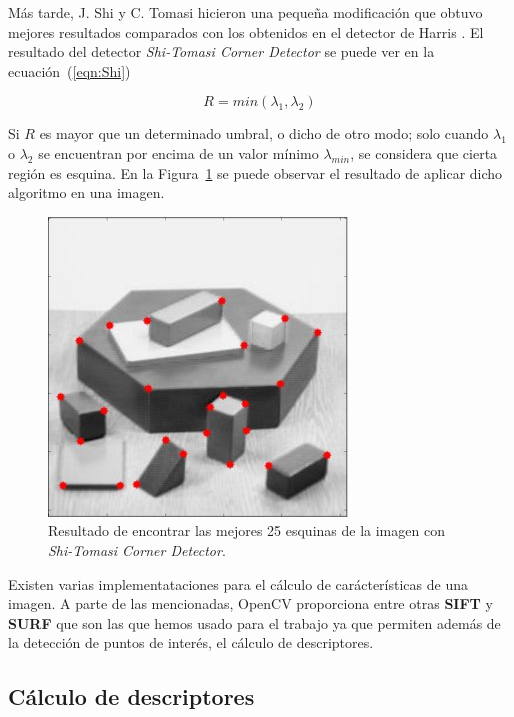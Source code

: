 Más tarde, J. Shi y C. Tomasi hicieron una pequeña modificación que obtuvo mejores resultados comparados con los obtenidos en el detector de Harris \parencite{Reference9}. El resultado del detector \textit{Shi-Tomasi Corner Detector} se puede ver en la ecuación~(\ref{eqn:Shi})

\begin{equation}
R=min(\lambda_{1},\lambda_{2})
\label{eqn:Shi}
\end{equation}

Si $R$ es mayor que un determinado umbral, o dicho de otro modo; solo cuando $\lambda_{1}$ o $\lambda_{2}$ se encuentran por encima de un valor mínimo $\lambda_{min}$, se considera que cierta región es esquina. En la Figura~\ref{fig:shi_detector} se puede observar el resultado de aplicar dicho algoritmo en una imagen.

\begin{figure}[ht]
\centering
\includegraphics[scale=0.5]{Figures/shi-detector.jpg}
\decoRule
\caption[Ejemplo con \textit{Shi-Tomasi Corner Detector}]{Resultado de encontrar las mejores 25 esquinas de la imagen con \textit{Shi-Tomasi Corner Detector}.}
\label{fig:shi_detector}
\end{figure}

Existen varias implementataciones para el cálculo de carácterísticas de una imagen. A parte de las mencionadas, OpenCV proporciona entre otras \textbf{SIFT} y \textbf{SURF} que son las que hemos usado para el trabajo ya que permiten además de la detección de puntos de interés, el cálculo de descriptores.

\subsection{Cálculo de descriptores}

